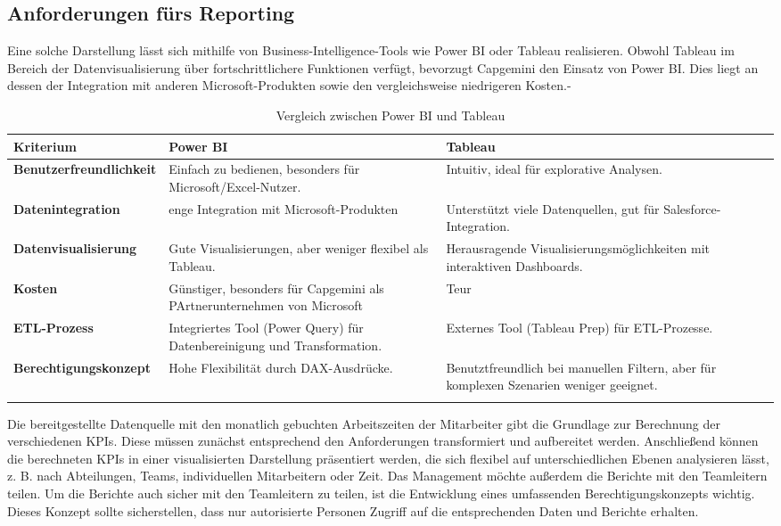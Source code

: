 \documentclass[a4paper, 12pt]{scrartcl}
\begin{document}
	\subsection{Anforderungen fürs Reporting}
Eine solche Darstellung lässt sich mithilfe von Business-Intelligence-Tools wie Power BI \cite{Power_bi} oder Tableau \cite{Tableua} realisieren. Obwohl Tableau im Bereich der Datenvisualisierung über fortschrittlichere Funktionen verfügt, bevorzugt Capgemini den Einsatz von Power BI. Dies liegt an dessen der Integration mit anderen Microsoft-Produkten sowie den vergleichsweise niedrigeren Kosten.-
	\newline
\begin{longtable}{|p{4.5cm}|p{5.5cm}|p{5.5cm}|}
	\hline
	\textbf{Kriterium} & \textbf{Power BI} & \textbf{Tableau} \\ \hline
	\textbf{Benutzerfreundlichkeit} & Einfach zu bedienen, besonders für Microsoft/Excel-Nutzer. & Intuitiv, ideal für explorative Analysen. \\ \hline
	\textbf{Datenintegration} & enge Integration mit Microsoft-Produkten & Unterstützt viele Datenquellen, gut für Salesforce-Integration. \\ \hline
	\textbf{Datenvisualisierung} & Gute Visualisierungen, aber weniger flexibel als Tableau. & Herausragende Visualisierungsmöglichkeiten mit interaktiven Dashboards. \\ \hline
	\textbf{Kosten} & Günstiger, besonders für Capgemini als PArtnerunternehmen von Microsoft & Teur \\ \hline
	\textbf{ETL-Prozess} & Integriertes Tool (Power Query) für Datenbereinigung und Transformation. & Externes Tool (Tableau Prep) für ETL-Prozesse. \\ \hline
	\textbf{Berechtigungskonzept} & Hohe Flexibilität durch DAX-Ausdrücke. & Benutztfreundlich bei manuellen Filtern, aber für komplexen Szenarien weniger geeignet.\\ \hline
	\caption{Vergleich zwischen Power BI und Tableau}
\end{longtable}
Die bereitgestellte Datenquelle mit den monatlich gebuchten Arbeitszeiten der Mitarbeiter gibt die Grundlage zur Berechnung der verschiedenen KPIs. Diese müssen zunächst entsprechend den Anforderungen transformiert und aufbereitet werden. Anschließend können die berechneten KPIs in einer visualisierten Darstellung präsentiert werden, die sich flexibel auf unterschiedlichen Ebenen analysieren lässt, z. B. nach Abteilungen, Teams, individuellen Mitarbeitern oder Zeit.\newline
Das Management möchte außerdem die Berichte mit den Teamleitern teilen.
Um die Berichte auch sicher mit den Teamleitern zu teilen, ist die Entwicklung eines umfassenden Berechtigungskonzepts wichtig. Dieses Konzept sollte sicherstellen, dass nur autorisierte Personen Zugriff auf die entsprechenden Daten und Berichte erhalten.
\end{document}
